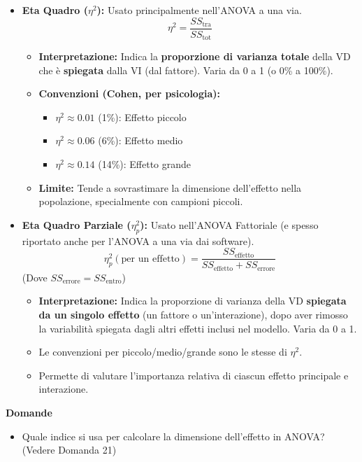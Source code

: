\documentclass[12pt, a4paper]{article}
\newenvironment{reflectionbox}{%
    \medskip
    \begin{framed}\par\noindent
    \textbf{\color{boxtitlecolor}Domande} \par
    \begin{itemize}[leftmargin=*, label=$\blacktriangleright$]
}{%
    \end{itemize}\par
    \end{framed}
    \medskip
}
\newcommand{\etasq}{\eta^2} %
\newcommand{\etasqpart}{\eta_p^2} %
\newcommand{\SSb}{SS_{\text{tra}}} %
\newcommand{\SSw}{SS_{\text{entro}}} %
\newcommand{\SStot}{SS_{\text{tot}}} %
\begin{document}
\begin{itemize}
    \item \textbf{Eta Quadro ($\etasq$):} Usato principalmente nell'ANOVA a una via.
        $$ \etasq = \frac{\SSb}{\SStot} $$
        \begin{itemize}
            \item \textbf{Interpretazione:} Indica la \textbf{proporzione di varianza totale} della VD che è \textbf{spiegata} dalla VI (dal fattore). Varia da 0 a 1 (o 0\% a 100\%).
            \item \textbf{Convenzioni (Cohen, per psicologia):}
                \begin{itemize}
                    \item $\etasq \approx 0.01$ (1\%): Effetto piccolo
                    \item $\etasq \approx 0.06$ (6\%): Effetto medio
                    \item $\etasq \approx 0.14$ (14\%): Effetto grande
                \end{itemize}
            \item \textbf{Limite:} Tende a sovrastimare la dimensione dell'effetto nella popolazione, specialmente con campioni piccoli.
        \end{itemize}
    \item \textbf{Eta Quadro Parziale ($\etasqpart$):} Usato nell'ANOVA Fattoriale (e spesso riportato anche per l'ANOVA a una via dai software).
        $$ \etasqpart (\text{per un effetto}) = \frac{SS_{\text{effetto}}}{SS_{\text{effetto}} + SS_{\text{errore}}} $$
        (Dove $SS_{\text{errore}} = \SSw$)
        \begin{itemize}
            \item \textbf{Interpretazione:} Indica la proporzione di varianza della VD \textbf{spiegata da un singolo effetto} (un fattore o un'interazione), dopo aver rimosso la variabilità spiegata dagli altri effetti inclusi nel modello. Varia da 0 a 1.
            \item Le convenzioni per piccolo/medio/grande sono le stesse di $\etasq$.
            \item Permette di valutare l'importanza relativa di ciascun effetto principale e interazione.
        \end{itemize}
\end{itemize}

\begin{reflectionbox}
    \item Quale indice si usa per calcolare la dimensione dell'effetto in ANOVA? (Vedere Domanda 21)
\end{reflectionbox}
\end{document}
